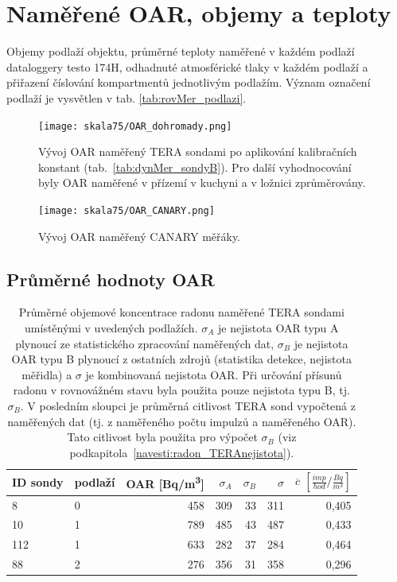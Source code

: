 \section{Naměřené OAR, objemy a teploty}

\begin{table}[H]
    \centering
    \caption{Objemy podlaží objektu, průměrné teploty naměřené v každém podlaží dataloggery testo 174H, odhadnuté atmosférické tlaky v každém podlaží a přiřazení číslování kompartmentů jednotlivým podlažím. Význam označení podlaží je vysvětlen v tab. \ref{tab:rovMer_podlazi}.}
    \label{tab:skala75_objemy}
    
\end{table}
\begin{figure}[H]
    \centering
    \texttt{[image: skala75/OAR\_dohromady.png]}
    \caption{Vývoj OAR naměřený TERA sondami po aplikování kalibračních konstant (tab.~\ref{tab:dynMer_sondyB}). Pro další vyhodnocování byly OAR naměřené v přízemí v kuchyni a v ložnici zprůměrovány.}
    \label{fig:skala75_OAR_dohromady}
\end{figure}
\begin{figure}[H]
    \centering
    \texttt{[image: skala75/OAR\_CANARY.png]}
    \caption{Vývoj OAR naměřený CANARY měřáky.}
    \label{fig:skala75_OAR_CANARY}
\end{figure}

\subsection{Průměrné hodnoty OAR}

\begin{table}[H]
    \centering
    \caption{Průměrné objemové koncentrace radonu naměřené TERA sondami umístěnými v uvedených podlažích. $\sigma_A$ je nejistota OAR typu A plynoucí ze statistického zpracování naměřených dat, $\sigma_B$ je nejistota OAR typu B plynoucí z ostatních zdrojů (statistika detekce, nejistota měřidla) a $\sigma$ je kombinovaná nejistota OAR. Při určování přísunů radonu v rovnovážném stavu byla použita pouze nejistota typu B, tj. $\sigma_B$. V posledním sloupci je průměrná citlivost TERA sond vypočtená z naměřených dat (tj. z naměřeného počtu impulzů a naměřeného OAR). Tato citlivost byla použita pro výpočet $\sigma_B$ (viz podkapitola~\ref{navesti:radon_TERAnejistota}).}
    \label{tab:skala75_OARprumerne}
    \begin{tabular}{llrrrrr}
\toprule
ID sondy&podlaží& OAR [\si{Bq/m^3}]& $\sigma_A$ & $\sigma_B$ &$\sigma$& $\overline{c}$ $\left[\si{\frac{imp}{hod}/\frac{Bq}{m^3}}\right]$\\ 
\midrule
8  &0 & 458 & 309 & 33 & 311&0,405\\
10 &1 & 789 & 485 & 43 & 487&0,433\\
112&1 & 633 & 282 & 37 & 284&0,464\\
88 &2 & 276 & 356 & 31 & 358&0,296\\
\bottomrule
    \end{tabular}
\end{table}

